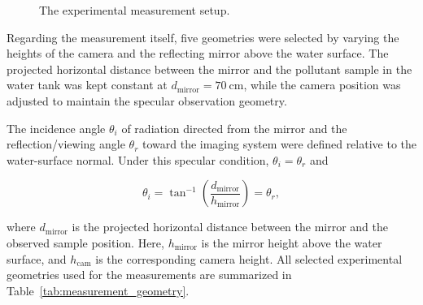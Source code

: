 \documentclass[pdflatex,sn-apa]{sn-jnl}
\begin{document}
\begin{figure}[t]
{%
}
\caption{The experimental measurement setup.}
\label{fig:setup}
\end{figure}

Regarding the measurement itself, five geometries were selected by varying the heights of the camera and the reflecting mirror above the water surface. The projected horizontal distance between the mirror and the pollutant sample in the water tank was kept constant at $d_{\mathrm{mirror}}=70~\mathrm{cm}$, while the camera position was adjusted to maintain the specular observation geometry.

The incidence angle $\theta_i$ of radiation directed from the mirror and the reflection/viewing angle $\theta_r$ toward the imaging system were defined relative to the water-surface normal. Under this specular condition, $\theta_i=\theta_r$ and

\begin{equation}
\theta_i=\tan^{-1}\left(\frac{d_{\mathrm{mirror}}}{h_{\mathrm{mirror}}}\right)=\theta_r,
\end{equation}

\noindent
where $d_{\mathrm{mirror}}$ is the projected horizontal distance between the mirror and the observed sample position. Here, $h_{\mathrm{mirror}}$ is the mirror height above the water surface, and $h_{\mathrm{cam}}$ is the corresponding camera height. All selected experimental geometries used for the measurements are summarized in Table~\ref{tab:measurement_geometry}.
\end{document}
